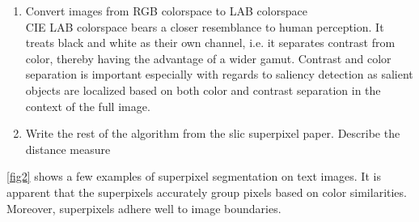 \documentclass[journal]{IEEEtran}
\begin{document}
{\begin{enumerate}
	\item Convert images from RGB colorspace to LAB colorspace \\
	
	CIE LAB colorspace bears a closer resemblance to human perception. It treats black and white as their own channel, i.e. it separates contrast from color, thereby having the advantage of a wider gamut. Contrast and color separation is important especially with regards to saliency detection as salient objects are localized based on both color and contrast separation in the context of the full image. 
	
	\item Write the rest of the algorithm from the slic superpixel paper. Describe the distance measure
\end{enumerate}

\ref{fig2} shows a few examples of superpixel segmentation on text images. It is apparent that the superpixels accurately group pixels based on color similarities. Moreover, superpixels adhere well to image boundaries.

}
\end{document}
